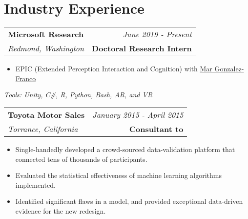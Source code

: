 \documentclass[10pt,a4paper]{article}
\begin{document}
    \vspace*{6mm}\section*{Industry Experience}
  
    \noindent\begin{tabularx}{17cm}{X r}
    \textbf{Microsoft Research} & \textit{June 2019 - Present} \\
    \textit{Redmond, Washington} & \textbf{Doctoral Research Intern} \\
  \end{tabularx}

  \vspace*{1mm}\noindent\begin{minipage}{17cm}
    \begin{itemize}[leftmargin=6mm,topsep=0mm,itemsep=-1mm]
      \item EPIC (Extended Perception Interaction and Cognition) with \href{https://www.microsoft.com/en-us/research/people/margon/}{Mar Gonzalez-Franco}
    \end{itemize}
  \end{minipage}

  \vspace*{2mm}\setlength\parindent{2mm}\begin{minipage}{16.8cm}
    \textit{Tools: Unity, C\#, R, Python, Bash, AR, and VR}
  \end{minipage}
\vspace*{1.5mm}


  \vspace*{3mm}\noindent\begin{tabularx}{17cm}{X r}
    \textbf{Toyota Motor Sales} & \textit{January 2015 - April 2015} \\
    \textit{Torrance, California} & \textbf{Consultant to} \\
  \end{tabularx}

  \vspace*{1mm}\noindent\begin{minipage}{17cm}
    \begin{itemize}[leftmargin=6mm,topsep=0mm,itemsep=-1mm]
      \item Single-handedly developed a crowd-sourced data-validation platform that connected tens of thousands of participants.
      \item Evaluated the statistical effectiveness of machine learning algorithms implemented.
      \item Identified significant flaws in a model, and provided exceptional data-driven evidence for the new redesign.
    \end{itemize}
  \end{minipage}
\end{document}
